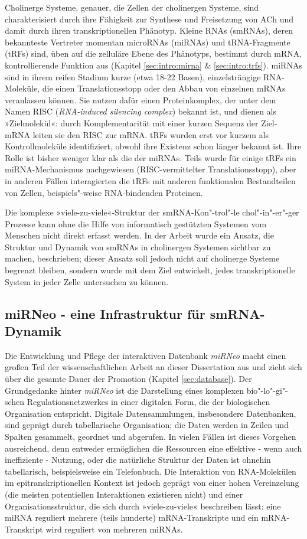 Cholinerge Systeme, genauer, die Zellen der cholinergen Systeme, sind charakterisiert durch ihre Fähigkeit zur Synthese und Freisetzung von ACh und damit durch ihren transkriptionellen Phänotyp. Kleine RNAs (smRNAs), deren bekannteste Vertreter momentan microRNAs (miRNAs) und tRNA-Fragmente (tRFs) sind, üben auf die zelluläre Ebene des Phänotyps, bestimmt durch mRNA, kontrollierende Funktion aus (Kapitel \ref{sec:intro:mirna} \& \ref{sec:intro:trfs}). miRNAs sind in ihrem reifen Stadium kurze (etwa 18-22 Basen), einzelsträngige RNA-Moleküle, die einen Translationsstopp oder den Abbau von einzelnen mRNAs veranlassen können. Sie nutzen dafür einen Proteinkomplex, der unter dem Namen RISC (\emph{RNA-induced silencing complex}) bekannt ist, und dienen als »Zielmolekül«: durch Komplementarität mit einer kurzen Sequenz der Ziel-mRNA leiten sie den RISC zur mRNA. tRFs wurden erst vor kurzem als Kontrollmoleküle identifiziert, obwohl ihre Existenz schon länger bekannt ist. Ihre Rolle ist bisher weniger klar als die der miRNAs. Teils wurde für einige tRFs ein miRNA-Mechanismus nachgewiesen (RISC-vermittelter Translationsstopp), aber in anderen Fällen interagierten die tRFs mit anderen funktionalen Bestandteilen von Zellen, beispiels"-weise RNA-bindenden Proteinen.

Die komplexe »viele-zu-viele«-Struktur der smRNA-Kon"-trol"-le chol"-in"-er"-ger Prozesse kann ohne die Hilfe von informatisch gestützten Systemen vom Menschen nicht direkt erfasst werden. In der Arbeit wurde ein Ansatz, die Struktur und Dynamik von smRNAs in cholinergen Systemen sichtbar zu machen, beschrieben; dieser Ansatz soll jedoch nicht auf cholinerge Systeme begrenzt bleiben, sondern wurde mit dem Ziel entwickelt, jedes transkriptionelle System in jeder Zelle untersuchen zu können.

\subsection{miRNeo - eine Infrastruktur für smRNA-Dynamik}
Die Entwicklung und Pflege der interaktiven Datenbank \emph{miRNeo} macht einen großen Teil der wissenschaftlichen Arbeit an dieser Dissertation aus und zieht sich über die gesamte Dauer der Promotion (Kapitel \ref{sec:database}). Der Grundgedanke hinter \emph{miRNeo} ist die Darstellung eines komplexen bio"-lo"-gi"-schen Regulationsnetzwerkes in einer digitalen Form, die der biologischen Organisation entspricht. Digitale Datensammlungen, insbesondere Datenbanken, sind geprägt durch tabellarische Organisation; die Daten werden in Zeilen und Spalten gesammelt, geordnet und abgerufen. In vielen Fällen ist dieses Vorgehen ausreichend, denn entweder ermöglichen die Ressourcen eine effektive - wenn auch ineffiziente - Nutzung, oder die natürliche Struktur der Daten ist ohnehin tabellarisch, beispielsweise ein Telefonbuch. Die Interaktion von RNA-Molekülen im epitranskriptionellen Kontext ist jedoch geprägt von einer hohen Vereinzelung (die meisten potentiellen Interaktionen existieren nicht) und einer Organisationsstruktur, die sich durch »viele-zu-viele« beschreiben lässt: eine miRNA reguliert mehrere (teils hunderte) mRNA-Transkripte und ein mRNA-Transkript wird reguliert von mehreren miRNAs.

